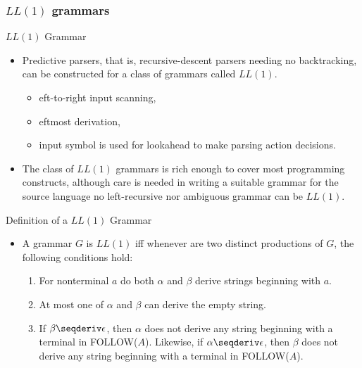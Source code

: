 \begin{bibunit}[apalike]
\subsubsection{$LL(1)$ grammars}

\tableofcontentslide[sectionstyle={show/shaded},subsectionstyle={show/shaded/hide},subsubsectionstyle={show/shaded/hide/hide}]

\begin{frame}{$LL(1)$ Grammar}
	\begin{itemize}
	\item Predictive parsers, that is, recursive-descent parsers needing no backtracking, can be constructed for a class of grammars called $LL(1)$.
	\vfill
		\begin{itemize}
		\item {}eft-to-right input scanning,
		\item {}eftmost derivation,
		\item {} input symbol is used for lookahead to make parsing action decisions.
		\end{itemize}
	\vfill
	\item The class of $LL(1)$ grammars is rich enough to cover most programming constructs, although care is needed in writing a suitable grammar for the source language \eg no left-recursive nor ambiguous grammar can be $LL(1)$.
	\end{itemize}
\end{frame}

\begin{frame}{Definition of a $LL(1)$ Grammar}
	\begin{itemize}
	\item A grammar $G$ is $LL(1)$ iff whenever  are two distinct productions of $G$, the following conditions hold:
		\begin{enumerate}
		\vfill
		\item For nonterminal $a$ do both $\alpha$ and $\beta$ derive strings beginning with $a$.
		\vfill
		\item At most one of $\alpha$ and $\beta$ can derive the empty string.
		\vfill
		\item If $\beta\seqderiv\epsilon$, then $\alpha$ does not derive any string beginning with a terminal in FOLLOW($A$). Likewise, if $\alpha\seqderiv\epsilon$, then $\beta$ does not derive any string beginning with a terminal in FOLLOW($A$).
		\end{enumerate}
	\end{itemize}
	\vfill
	\begin{small}
	\begin{bnf}
	\p{                ::= $\epsilon$}
	\end{bnf}
	\end{small}
\end{frame}


\end{bibunit}
